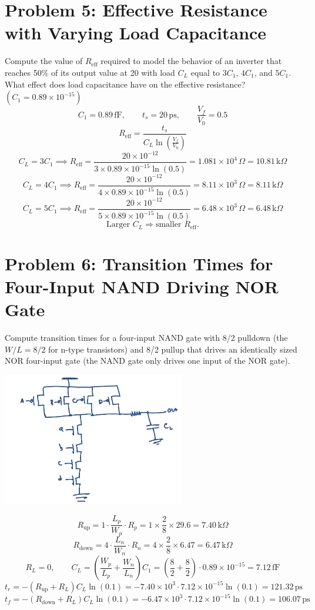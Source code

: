 \documentclass[11pt]{article}
\begin{document}
\section*{Problem 5: Effective Resistance with Varying Load Capacitance}
Compute the value of \(R_{\text{eff}}\) required to model the behavior of an inverter that reaches 50\% of its output value at 20 with load \(C_L\) equal to \(3C_1\), \(4C_1\), and \(5C_1\). What effect does load capacitance have on the effective resistance? \((C_1 = 0.89\times 10^{-15})\)
\[
C_1 = 0.89\,\text{fF},\qquad t_s = 20\,\text{ps},\qquad \frac{V_f}{V_0} = 0.5
\]
\[
R_{\text{eff}} = \frac{t_s}{C_L \ln \left( \frac{V_f}{V_0} \right)}
\]
\[
C_L = 3C_1 \implies R_{\text{eff}} = \frac{20\times10^{-12}}{3 \times 0.89 \times 10^{-15} \ln(0.5)} = 1.081\times10^{4}\,\Omega = 10.81\,\text{k}\Omega
\]
\[
C_L = 4C_1 \implies R_{\text{eff}} = \frac{20\times10^{-12}}{4 \times 0.89 \times 10^{-15} \ln(0.5)} = 8.11\times10^{3}\,\Omega = 8.11\,\text{k}\Omega
\]
\[
C_L = 5C_1 \implies R_{\text{eff}} = \frac{20\times10^{-12}}{5 \times 0.89 \times 10^{-15} \ln(0.5)} = 6.48\times10^{3}\,\Omega = 6.48\,\text{k}\Omega
\]
\[
\text{Larger } C_L \Rightarrow \text{smaller } R_{\text{eff}}.
\]

\clearpage

\section*{Problem 6: Transition Times for Four-Input NAND Driving NOR Gate}
Compute transition times for a four-input NAND gate with 8/2 pulldown (the \(W/L = 8/2\) for n-type transistors) and 8/2 pullup that drives an identically sized NOR four-input gate (the NAND gate only drives one input of the NOR gate).
\begin{center}
    \includegraphics[width=0.6\textwidth]{question6/6.jpeg}
\end{center}
\[
R_{\text{up}} = 1 \cdot \frac{L_p}{W_p} \cdot R_p = 1 \times \frac{2}{8} \times 29.6 = 7.40\,\text{k}\Omega
\]
\[
R_{\text{down}} = 4 \cdot \frac{L_n}{W_n} \cdot R_n = 4 \times \frac{2}{8} \times 6.47 = 6.47\,\text{k}\Omega
\]
\[
R_L = 0,\qquad C_L = \left(\frac{W_p}{L_p} + \frac{W_n}{L_n}\right) C_1 = \left(\frac{8}{2} + \frac{8}{2}\right) \cdot 0.89\times10^{-15} = 7.12\,\text{fF}
\]
\[
t_r = -(R_{\text{up}} + R_L) C_L \ln(0.1) = -7.40\times10^3 \cdot 7.12\times10^{-15} \ln(0.1) = 121.32\,\text{ps}
\]
\[
t_f = -(R_{\text{down}} + R_L) C_L \ln(0.1) = -6.47\times10^3 \cdot 7.12\times10^{-15} \ln(0.1) = 106.07\,\text{ps}
\]
\end{document}
